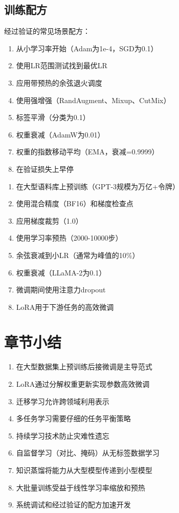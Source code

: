 \subsection{训练配方}

经过验证的常见场景配方：

\begin{algorithm}[H]
\caption{视觉模型训练配方}
\begin{enumerate}
    \item 从小学习率开始（Adam为1e-4，SGD为0.1）
    \item 使用LR范围测试找到最优LR
    \item 应用带预热的余弦退火调度
    \item 使用强增强（RandAugment、Mixup、CutMix）
    \item 标签平滑（分类为0.1）
    \item 权重衰减（AdamW为0.01）
    \item 权重的指数移动平均（EMA，衰减=0.9999）
    \item 在验证损失上早停
\end{enumerate}
\end{algorithm}

\begin{algorithm}[H]
\caption{LLM训练配方}
\begin{enumerate}
    \item 在大型语料库上预训练（GPT-3规模为万亿+令牌）
    \item 使用混合精度（BF16）和梯度检查点
    \item 应用梯度裁剪（1.0）
    \item 使用学习率预热（2000-10000步）
    \item 余弦衰减到小LR（通常为峰值的10\%）
    \item 权重衰减（LLaMA-2为0.1）
    \item 微调期间使用注意力dropout
    \item LoRA用于下游任务的高效微调
\end{enumerate}
\end{algorithm}

\section{章节小结}

\begin{enumerate}
    \item 在大型数据集上预训练后接微调是主导范式
    \item LoRA通过分解权重更新实现参数高效微调
    \item 迁移学习允许跨领域利用表示
    \item 多任务学习需要仔细的任务平衡策略
    \item 持续学习技术防止灾难性遗忘
    \item 自监督学习（对比、掩码）从无标签数据学习
    \item 知识蒸馏将能力从大型模型传递到小型模型
    \item 大批量训练受益于线性学习率缩放和预热
    \item 系统调试和经过验证的配方加速开发
\end{enumerate}

